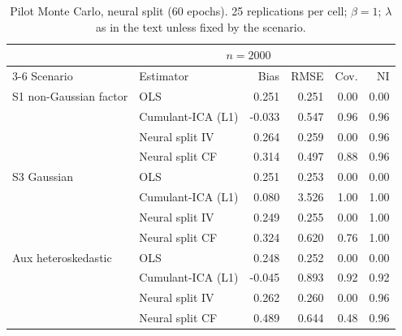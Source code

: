 \begin{table}[ht]
\centering
\scriptsize
\setlength{\tabcolsep}{2.5pt}
\caption{Pilot Monte Carlo, neural split (60 epochs).  25 replications per cell; $\beta=1$; $\lambda$ as in the text unless fixed by the scenario.}\label{tab:pilot-nn}
\begin{tabular}{@{}llrrrr@{}}
\toprule
 & \multicolumn{4}{c}{$n=2000$} \\
\cmidrule(lr){3-6}
Scenario & Estimator & Bias & RMSE & Cov. & NI \\
\midrule
S1 non-Gaussian factor & OLS & 0.251 & 0.251 & 0.00 & 0.00 \\
 & Cumulant-ICA (L1) & -0.033 & 0.547 & 0.96 & 0.96 \\
 & Neural split IV & 0.264 & 0.259 & 0.00 & 0.96 \\
 & Neural split CF & 0.314 & 0.497 & 0.88 & 0.96 \\
\addlinespace
S3 Gaussian & OLS & 0.251 & 0.253 & 0.00 & 0.00 \\
 & Cumulant-ICA (L1) & 0.080 & 3.526 & 1.00 & 1.00 \\
 & Neural split IV & 0.249 & 0.255 & 0.00 & 1.00 \\
 & Neural split CF & 0.324 & 0.620 & 0.76 & 1.00 \\
\addlinespace
Aux heteroskedastic & OLS & 0.248 & 0.252 & 0.00 & 0.00 \\
 & Cumulant-ICA (L1) & -0.045 & 0.893 & 0.92 & 0.92 \\
 & Neural split IV & 0.262 & 0.260 & 0.00 & 0.96 \\
 & Neural split CF & 0.489 & 0.644 & 0.48 & 0.96 \\
\bottomrule
\end{tabular}
\end{table}
